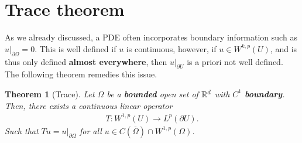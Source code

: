 \documentclass[12pt]{article}
\newtheorem{theorem}{Theorem}
\theoremstyle{remark}
\newcommand\restr[2]{\left.#1\right|_{#2}}
\begin{document}
\section{Trace theorem}
As we already discussed, a PDE often incorporates boundary information such as $\restr{u}{\partial \Omega}=0$. This is well defined if $u$ is continuous, however, if  $u \in  W^{k,p}(U)$, and is thus only defined \textbf{almost everywhere}, then $\restr{u}{\partial  U}$ is a priori not well defined. The following theorem remedies this issue.
\begin{theorem}[Trace]\label{trace} Let $\Omega $ be a \textbf{bounded} open set of $\mathbb{R}^d$ with $C^1$  \textbf{boundary}. Then, there exists a continuous linear operator
	\begin{align*}
		T: W^{1,p}(U)\to L^p(\partial U) .
	\end{align*}
	Such that $ Tu =\restr{u}{\partial \Omega} $ for all $u \in C(\overline{\Omega}) \cap W^{1,p}(\Omega)$.
\end{theorem}
\end{document}
